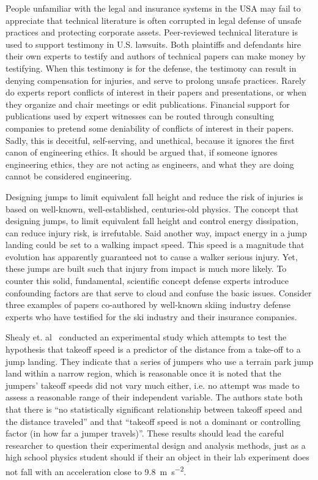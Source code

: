 \documentclass{article}
\begin{document}
People unfamiliar with the legal and insurance systems in the USA may fail to
appreciate that technical literature is often corrupted in legal defense of
unsafe practices and protecting corporate assets. Peer-reviewed technical
literature is used to support testimony in U.S. lawsuits. Both plaintiffs and
defendants hire their own experts to testify and authors of technical papers
can make money by testifying. When this testimony is for the defense, the
testimony can result in denying compensation for injuries, and serve to prolong
unsafe practices. Rarely do experts report conflicts of interest in their
papers and presentations, or when they organize and chair meetings or edit
publications. Financial support for publications used by expert witnesses can
be routed through consulting companies to pretend some deniability of conflicts
of interest in their papers. Sadly, this is deceitful, self-serving, and
unethical, because it ignores the first canon of engineering ethics. It should
be argued that, if someone ignores engineering ethics, they are not acting as
engineers, and what they are doing cannot be considered engineering.

Designing jumps to limit equivalent fall height and reduce the risk of injuries
is based on well-known, well-established, centuries-old physics. The concept
that designing jumps, to limit equivalent fall height and control energy
dissipation, can reduce injury risk, is irrefutable. Said another way, impact
energy in a jump landing could be set to a walking impact speed. This speed is a magnitude that evolution has apparently guaranteed not to cause a walker serious injury. Yet, these jumps are built such that injury from impact is much more likely. To counter this solid, fundamental, scientific concept defense experts introduce
confounding factors are that serve to cloud and confuse the basic issues.
Consider three examples of papers co-authored by well-known skiing industry
defense experts who have testified for the ski industry and their insurance
companies.

Shealy et. al~\cite{Shealy2010} conducted an experimental study which attempts
to test the hypothesis that takeoff speed is a predictor of the distance from a
take-off to a jump landing. They indicate that a series of jumpers who use a
terrain park jump land within a narrow region, which is reasonable once it is
noted that the jumpers' takeoff speeds did not vary much either, i.e. no
attempt was made to assess a reasonable range of their independent variable.
The authors state both that there is ``no statistically significant
relationship between takeoff speed and the distance traveled'' and that
``takeoff speed is not a dominant or controlling factor (in how far a jumper
travels)''. These results should lead the careful researcher to question their
experimental design and analysis methods, just as a high school physics student
should if their an object in their lab experiment does not fall with an
acceleration close to 9.8~\si{\meter\per\second\squared}.
\end{document}
